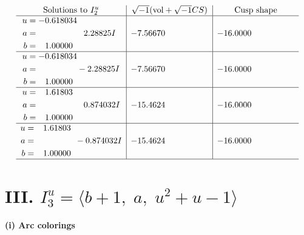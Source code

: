 \documentclass[1p]{elsarticle_modified}
\theoremstyle{definition}
\newcommand{\I}{\sqrt{-1}}
\begin{document}
$$\begin{array}{c|c|c}  
\text{Solutions to }I^u_{2}& \I (\text{vol} + \sqrt{-1}CS) & \text{Cusp shape}\\
 \hline 
\begin{aligned}
u &= -0.618034\phantom{ +0.000000I} \\
a &= \phantom{-0.000000 -}2.28825 I \\
b &= \phantom{-}1.00000\phantom{ +0.000000I}\end{aligned}
 & -7.56670\phantom{ +0.000000I} & -16.0000\phantom{ +0.000000I} \\ \hline\begin{aligned}
u &= -0.618034\phantom{ +0.000000I} \\
a &= \phantom{-0.000000 } -2.28825 I \\
b &= \phantom{-}1.00000\phantom{ +0.000000I}\end{aligned}
 & -7.56670\phantom{ +0.000000I} & -16.0000\phantom{ +0.000000I} \\ \hline\begin{aligned}
u &= \phantom{-}1.61803\phantom{ +0.000000I} \\
a &= \phantom{-0.000000 -}0.874032 I \\
b &= \phantom{-}1.00000\phantom{ +0.000000I}\end{aligned}
 & -15.4624\phantom{ +0.000000I} & -16.0000\phantom{ +0.000000I} \\ \hline\begin{aligned}
u &= \phantom{-}1.61803\phantom{ +0.000000I} \\
a &= \phantom{-0.000000 } -0.874032 I \\
b &= \phantom{-}1.00000\phantom{ +0.000000I}\end{aligned}
 & -15.4624\phantom{ +0.000000I} & -16.0000\phantom{ +0.000000I}\\
 \hline 
 \end{array}$$\newpage\newpage\renewcommand{\arraystretch}{1}
\centering \section*{III. $I^u_{3}= \langle b+1,\;a,\;u^2+u-1 \rangle$}
\flushleft \textbf{(i) Arc colorings}\\
\end{document}

